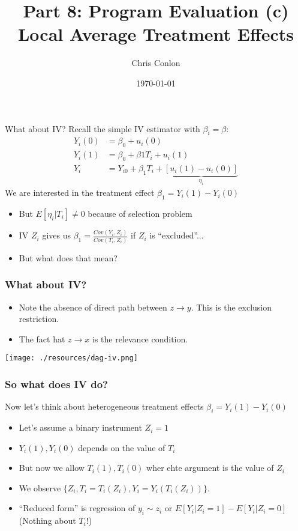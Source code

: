 \documentclass[xcolor=pdftex,dvipsnames,table,mathserif,aspectratio=169]{beamer}
\begin{document}
\title{Part 8: Program Evaluation (c)\\
Local Average Treatment Effects}
\author{Chris Conlon}
\date{\today}

\frame{\titlepage}



\begin{frame}{What about IV?}
Recall the simple IV estimator with $\beta_i = \beta$:
\begin{align*}
Y_i(0) &= \beta_0 + u_i(0)\\
Y_i(1) &= \beta_0 + \beta1 T_i +  u_i(1)\\
Y_i &= Y_{i0} + \beta_1 T_i  + \underbrace{[u_i(1) - u_i(0)]}_{\eta_i}
\end{align*}
We are interested in the \alert{treatment effect} $\beta_1 = Y_i(1) - Y_i(0)$
\begin{itemize}
\item But $E[\eta_i |  T_i] \neq 0$ because of \alert{selection problem}
\item IV $Z_i$ gives us $\beta_1 = \frac{Cov(Y_i,Z_i)}{Cov(T_i,Z_i)}$ if $Z_i$ is ``excluded''...
\item But what does that mean?
\end{itemize}
\end{frame}

\begin{frame}
\frametitle{What about IV?}
\begin{itemize}
\item Note the absence of direct path between $z \rightarrow y$. This is the \alert{exclusion restriction}.
\item The fact hat $z \rightarrow x$ is the \alert{relevance} condition.
\end{itemize}
\begin{center}
\texttt{[image: ./resources/dag-iv.png]}
\end{center}

\end{frame}


\begin{frame}
\frametitle{So what does IV do?}
Now let's think about \alert{heterogeneous treatment effects} $\beta_i = Y_i(1) - Y_i(0)$
\begin{itemize}
\item Let's assume a binary instrument $Z_i=1$
\item $Y_i(1),Y_i(0)$ depends on the value of $T_i$
\item But now we allow $T_i(1),T_i(0)$ wher ehte argument is the value of $Z_i$
\item We observe $\{Z_i, T_i = T_i(Z_i), Y_i = Y_i(T_i(Z_i))\}$.
\item ``Reduced form'' is regression of $y_i \sim z_i$ or $E[Y_i | Z_i =1] - E[Y_i | Z_i =0]$\\
(Nothing about $T_i$!)
\end{itemize}
\end{frame}
\end{document}
